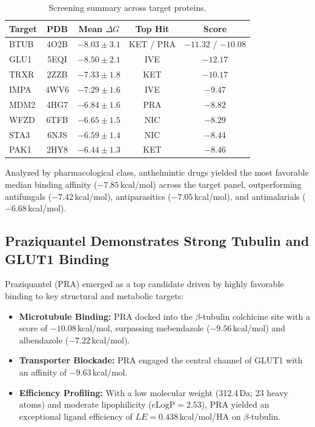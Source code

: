 \documentclass[10pt,a4paper,twocolumn]{article}
\begin{document}
\begin{table}[h!]
\centering
\caption{Screening summary across target proteins.}
\label{tab:target_summary}
\small
\begin{tabularx}{\columnwidth}{lcccc}
\toprule
\textbf{Target} & \textbf{PDB} & \textbf{Mean $\Delta G$} & \textbf{Top Hit} & \textbf{Score} \\
\midrule
BTUB  & 4O2B & $-8.03 \pm 3.1$ & KET / PRA & $-11.32$ / $-10.08$ \\
GLU1  & 5EQI & $-8.50 \pm 2.1$ & IVE       & $-12.17$ \\
TRXR  & 2ZZB & $-7.33 \pm 1.8$ & KET       & $-10.17$ \\
IMPA  & 4WV6 & $-7.29 \pm 1.6$ & IVE       & $-9.47$  \\
MDM2  & 4HG7 & $-6.84 \pm 1.6$ & PRA       & $-8.82$  \\
WFZD  & 6TFB & $-6.65 \pm 1.5$ & NIC       & $-8.29$  \\
STA3  & 6NJS & $-6.59 \pm 1.4$ & NIC       & $-8.44$  \\
PAK1  & 2HY8 & $-6.44 \pm 1.3$ & KET       & $-8.46$  \\
\bottomrule
\end{tabularx}
\end{table}

Analyzed by pharmacological class, anthelmintic drugs yielded the most favorable median binding affinity ($-7.85$\,kcal/mol) across the target panel, outperforming antifungals ($-7.42$\,kcal/mol), antiparasitics ($-7.05$\,kcal/mol), and antimalarials ($-6.68$\,kcal/mol).

\subsection{Praziquantel Demonstrates Strong Tubulin and GLUT1 Binding}
Praziquantel (PRA) emerged as a top candidate driven by highly favorable binding to key structural and metabolic targets:
\begin{itemize}
    \item \textbf{Microtubule Binding:} PRA docked into the $\beta$-tubulin colchicine site with a score of $-10.08$\,kcal/mol, surpassing mebendazole ($-9.56$\,kcal/mol) and albendazole ($-7.22$\,kcal/mol).
    \item \textbf{Transporter Blockade:} PRA engaged the central channel of GLUT1 with an affinity of $-9.63$\,kcal/mol.
    \item \textbf{Efficiency Profiling:} With a low molecular weight (312.4\,Da; 23 heavy atoms) and moderate lipophilicity ($\text{cLogP} = 2.53$), PRA yielded an exceptional ligand efficiency of $LE = 0.438$\,kcal/mol/HA on $\beta$-tubulin.
\end{itemize}
\end{document}
